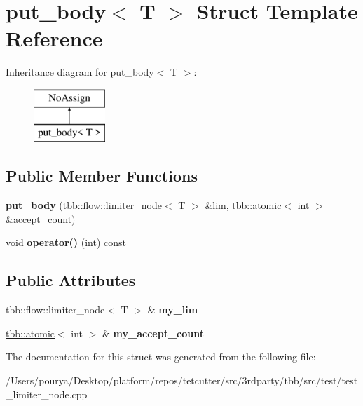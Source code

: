 \hypertarget{structput__body}{}\section{put\+\_\+body$<$ T $>$ Struct Template Reference}
\label{structput__body}
Inheritance diagram for put\+\_\+body$<$ T $>$\+:\begin{figure}[H]
\begin{center}
\leavevmode
\includegraphics[height=2.000000cm]{structput__body}
\end{center}
\end{figure}
\subsection*{Public Member Functions}
\begin{DoxyCompactItemize}
\item 
\hypertarget{structput__body_a07ffef40f90a08c0d24272c3b5dfcb29}{}{\bfseries put\+\_\+body} (tbb\+::flow\+::limiter\+\_\+node$<$ T $>$ \&lim, \hyperlink{structtbb_1_1atomic}{tbb\+::atomic}$<$ int $>$ \&accept\+\_\+count)\label{structput__body_a07ffef40f90a08c0d24272c3b5dfcb29}

\item 
\hypertarget{structput__body_abd279f9f2ad1e2b4b841faa901f6e578}{}void {\bfseries operator()} (int) const \label{structput__body_abd279f9f2ad1e2b4b841faa901f6e578}

\end{DoxyCompactItemize}
\subsection*{Public Attributes}
\begin{DoxyCompactItemize}
\item 
\hypertarget{structput__body_af2a0e397e511ca3e7c5567ed5d013332}{}tbb\+::flow\+::limiter\+\_\+node$<$ T $>$ \& {\bfseries my\+\_\+lim}\label{structput__body_af2a0e397e511ca3e7c5567ed5d013332}

\item 
\hypertarget{structput__body_ac322c9f537ee213f1d0f4417495d1465}{}\hyperlink{structtbb_1_1atomic}{tbb\+::atomic}$<$ int $>$ \& {\bfseries my\+\_\+accept\+\_\+count}\label{structput__body_ac322c9f537ee213f1d0f4417495d1465}

\end{DoxyCompactItemize}


The documentation for this struct was generated from the following file\+:\begin{DoxyCompactItemize}
\item 
/\+Users/pourya/\+Desktop/platform/repos/tetcutter/src/3rdparty/tbb/src/test/test\+\_\+limiter\+\_\+node.\+cpp\end{DoxyCompactItemize}
